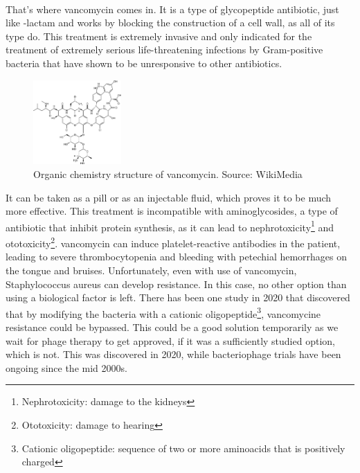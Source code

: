 \paragraph{}That's where vancomycin comes in. It is a type of glycopeptide antibiotic, just like \beta-lactam and works by blocking the construction of a cell wall, as all of its type do. This treatment is extremely invasive and only indicated for the treatment of extremely serious life-threatening infections by Gram-positive bacteria that have shown to be unresponsive to other antibiotics.\begin{figure}\begin{center}\includegraphics[width=0.30\textwidth]{assets/vancomycin.png}\end{center}\caption{Organic chemistry structure of vancomycin. Source: WikiMedia}\vspace{0.15\linewidth}\end{figure}\newline It can be taken as a pill or as an injectable fluid, which proves it to be much more effective. This treatment is incompatible with aminoglycosides, a type of antibiotic that inhibit protein synthesis, as it can lead to nephrotoxicity\footnote{Nephrotoxicity: damage to the kidneys} and ototoxicity\footnote{Ototoxicity: damage to hearing}. vancomycin can induce platelet-reactive antibodies in the patient, leading to severe thrombocytopenia and bleeding with petechial hemorrhages on the tongue and bruises. Unfortunately, even with use of vancomycin, Staphylococcus aureus can develop resistance. In this case, no other option than using a biological factor is left. There has been one study in 2020 that discovered that by modifying the bacteria with a cationic oligopeptide\footnote{Cationic oligopeptide: sequence of two or more aminoacids that is positively charged}, vancomycine resistance could be bypassed. This could be a good solution temporarily as we wait for phage therapy to get approved, if it was a sufficiently studied option, which is not. This was discovered in 2020, while bacteriophage trials have been ongoing since the mid 2000s.
